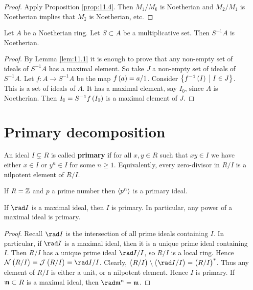 \begin{proof}
Apply Proposition \ref{prop:11.4}. Then $ M_1 / M_0 $ is Noetherian and $ M_2 / M_1 $ is Noetherian implies that $ M_2 $ is Noetherian, etc.
\end{proof}

\begin{lemma}
\label{lem:11.7}
Let $ A $ be a Noetherian ring. Let $ S \subset A $ be a multiplicative set. Then $ S^{-1}A $ is Noetherian.
\end{lemma}

\begin{proof}
By Lemma \ref{lem:11.1} it is enough to prove that any non-empty set of ideals of $ S^{-1}A $ has a maximal element. So take $ J $ a non-empty set of ideals of $ S^{-1}A $. Let $ f : A \to S^{-1}A $ be the map $ f\br{a} = a / 1 $. Consider $ \cbr{f^{-1}\br{I} \st I \in J} $. This is a set of ideals of $ A $. It has a maximal element, say $ I_0 $, since $ A $ is Noetherian. Then $ I_0 = S^{-1}f\br{I_0} $ is a maximal element of $ J $.
\end{proof}

\pagebreak

\section{Primary decomposition}

\begin{definition}
An ideal $ I \subsetneq R $ is called \textbf{primary} if for all $ x, y \in R $ such that $ xy \in I $ we have either $ x \in I $ or $ y^n \in I $ for some $ n \ge 1 $. Equivalently, every zero-divisor in $ R / I $ is a nilpotent element of $ R / I $.
\end{definition}

\begin{example*}
If $ R = \mathbb{Z} $ and $ p $ a prime number then $ \left\langle p^n \right\rangle $ is a primary ideal.
\end{example*}


\begin{proposition}
\label{prop:12.2}
If $ \rad I $ is a maximal ideal, then $ I $ is primary. In particular, any power of a maximal ideal is primary.
\end{proposition}

\begin{proof}
Recall $ \rad I $ is the intersection of all prime ideals containing $ I $. In particular, if $ \rad I $ is a maximal ideal, then it is a unique prime ideal containing $ I $. Then $ R / I $ has a unique prime ideal $ \rad I / I $, so $ R / I $ is a local ring. Hence $ \NNN\br{R / I} = \JJJ\br{R / I} = \rad I / I $. Clearly, $ \br{R / I} \setminus \br{\rad I / I} = \br{R / I}^* $. Thus any element of $ R / I $ is either a unit, or a nilpotent element. Hence $ I $ is primary. If $ \mathfrak{m} \subset R $ is a maximal ideal, then $ \rad \mmm^n = \mmm $.
\end{proof}

